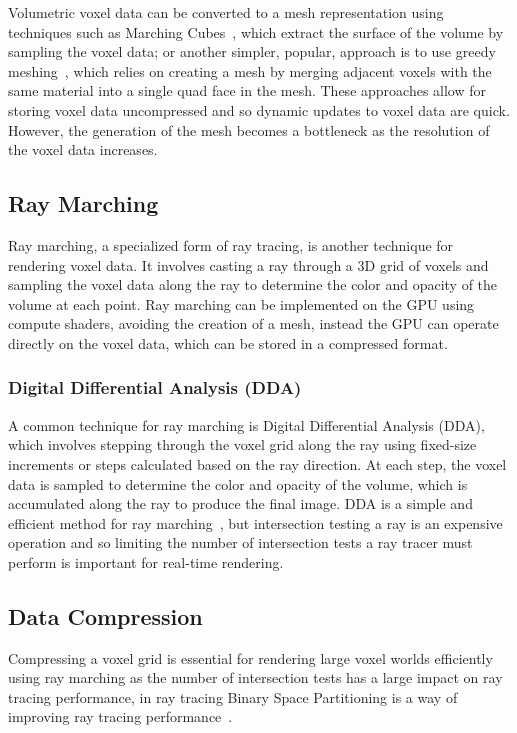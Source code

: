 \documentclass{article}
\begin{document}
Volumetric voxel data can be converted to a mesh representation using techniques such as Marching Cubes~\cite{Amran_1998}, which extract the surface of the volume by sampling the voxel data; or another simpler, popular, approach is to use greedy meshing~\cite{mikolalysenko_2012}, which relies on creating a mesh by merging adjacent voxels with the same material into a single quad face in the mesh. These approaches allow for storing voxel data uncompressed and so dynamic updates to voxel data are quick. However, the generation of the mesh becomes a bottleneck as the resolution of the voxel data increases.

\subsection{Ray Marching}
Ray marching, a specialized form of ray tracing, is another technique for rendering voxel data. It involves casting a ray through a 3D grid of voxels and sampling the voxel data along the ray to determine the color and opacity of the volume at each point. Ray marching can be implemented on the GPU using compute shaders, avoiding the creation of a mesh, instead the GPU can operate directly on the voxel data, which can be stored in a compressed format.

\subsubsection{Digital Differential Analysis (DDA)}
A common technique for ray marching is Digital Differential Analysis (DDA), which involves stepping through the voxel grid along the ray using fixed-size increments or steps calculated based on the ray direction. At each step, the voxel data is sampled to determine the color and opacity of the volume, which is accumulated along the ray to produce the final image. DDA is a simple and efficient method for ray marching~\cite{Amanatides_Woo_1987}, but intersection testing a ray is an expensive operation and so limiting the number of intersection tests a ray tracer must perform is important for real-time rendering.

\subsection{Data Compression}
Compressing a voxel grid is essential for rendering large voxel worlds efficiently using ray marching as the number of intersection tests has a large impact on ray tracing performance, in ray tracing Binary Space Partitioning is a way of improving ray tracing performance~\cite{Ize_2009}.
\end{document}

